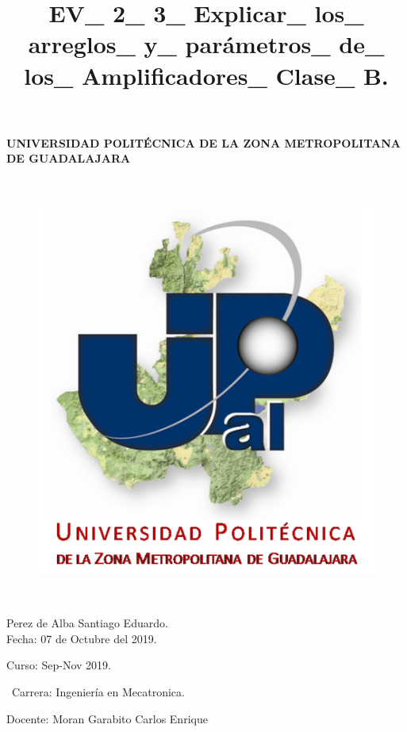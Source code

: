 \documentclass[12pt,letterpaper]{article}
\title{EV\_ 2\_ 3\_ Explicar\_ los\_ arreglos\_ y\_ parámetros\_ de\_ los\_ Amplificadores\_ Clase\_ B.}
\begin{document}
\maketitle




\paragraph{ UNIVERSIDAD POLITÉCNICA DE LA ZONA METROPOLITANA DE GUADALAJARA}

\
\begin{figure}[h!]
\begin{center}

\includegraphics[scale=0.8]{Upzmg.png} 
\label{Upzmg}


\end{center}
\end{figure}


\

\large{Perez de Alba Santiago Eduardo.\\
Fecha: 07 de Octubre del 2019.
\

Curso: Sep-Nov 2019.

\
Carrera: Ingeniería en Mecatronica.\

Docente: Moran Garabito Carlos Enrique}

\newpage
\end{document}

